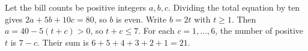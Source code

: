 Let the bill counts be positive integers $a,b,c$. Dividing the total equation by ten gives $2a+5b+10c=80$, so $b$ is even. Write $b=2t$ with $t\ge1$. Then $a=40-5(t+c)>0$, so $t+c\le7$. For each $c=1,\ldots,6$, the number of positive $t$ is $7-c$. Their sum is $6+5+4+3+2+1=\boxed{21}$.
